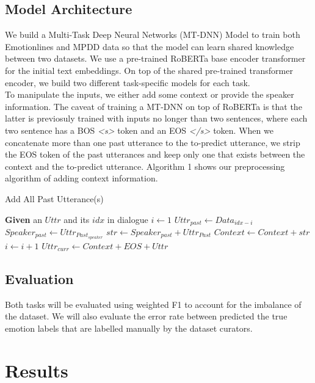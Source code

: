 \documentclass[11pt]{article}
\begin{document}
\subsection{Model Architecture}

We build a Multi-Task Deep Neural Networks (MT-DNN) Model \citet{liu-etal-2019-multi} to train both Emotionlines and MPDD data so that the model can learn shared knowledge between two datasets. We use a pre-trained RoBERTa base encoder transformer for the initial text embeddings. On top of the shared pre-trained transformer encoder, we build two different task-specific models for each task. \\
To manipulate the inputs, we either add some context or provide the speaker information. The caveat of training a MT-DNN on top of RoBERTa is that the latter is previosuly trained with inputs no longer than two sentences, where each two sentence has a BOS \textit{<s>} token and an EOS \textit{</s>} token. When we concatenate more than one past utterance to the to-predict utterance, we strip the EOS token of the past utterances and keep only one that exists between the context and the to-predict utterance. Algorithm 1 shows our preprocessing algorithm of adding context information.
\begin{algorithm}
\caption{Add All Past Utterance(s)}\label{euclid}
\begin{algorithmic}[1]
\State \textbf{Given} an $Uttr$ and its $idx$ in dialogue
    \State $i \gets 1$
        \State $Uttr_{past} \gets Data_{idx-i}$
        \State $Speaker_{past} \gets Uttr_{Past_{speaker}}$
        \State $str \gets Speaker_{past} + Uttr_{Past}$
        \State $Context \gets Context + str$
        \State $i \gets i + 1$
    \EndWhile
\EndIf
\State $Uttr_{curr} \gets Context + EOS + Uttr$
\end{algorithmic}
\end{algorithm}

\subsection{Evaluation}

Both tasks will be evaluated using weighted F1 to account for the imbalance of the dataset. We will also evaluate the error rate between predicted the true emotion labels that are labelled manually by the dataset curators. 


\section{Results}
\label{sec:results}
\end{document}
